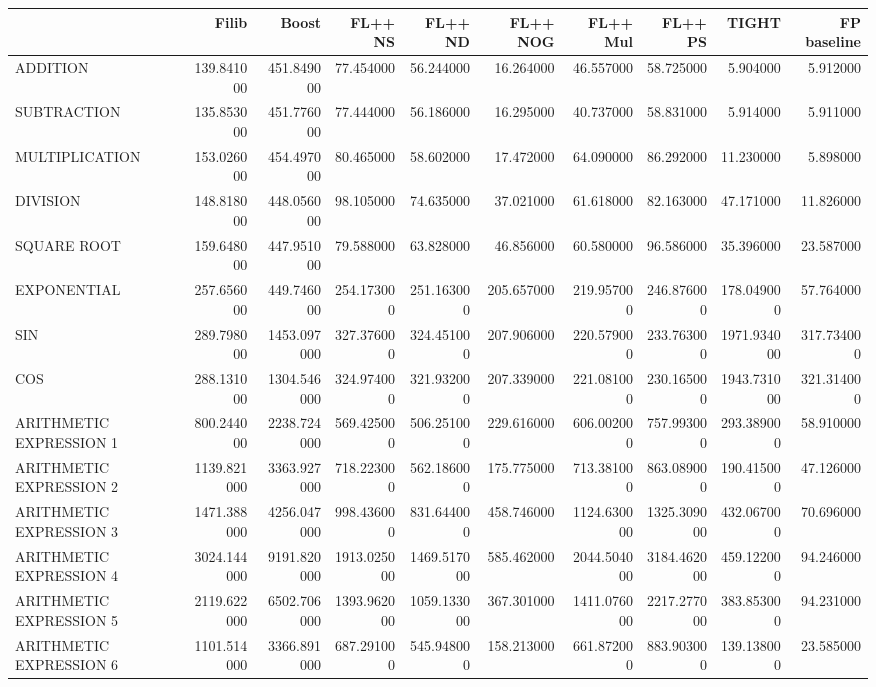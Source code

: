 \clearpage
\onecolumn
\begingroup

\tiny
\begin{longtable}{lrrrrrrrrr}
\hline
& Filib & Boost & FL++ NS & FL++ ND & FL++ NOG & FL++ Mul & FL++ PS & TIGHT & FP baseline \\
\hline
ADDITION & 139.841000 & 451.849000 & 77.454000 & 56.244000 & 16.264000 & 46.557000 & 58.725000 & 5.904000 & 5.912000 \\
SUBTRACTION & 135.853000 & 451.776000 & 77.444000 & 56.186000 & 16.295000 & 40.737000 & 58.831000 & 5.914000 & 5.911000 \\
MULTIPLICATION & 153.026000 & 454.497000 & 80.465000 & 58.602000 & 17.472000 & 64.090000 & 86.292000 & 11.230000 & 5.898000 \\
DIVISION & 148.818000 & 448.056000 & 98.105000 & 74.635000 & 37.021000 & 61.618000 & 82.163000 & 47.171000 & 11.826000 \\
SQUARE ROOT & 159.648000 & 447.951000 & 79.588000 & 63.828000 & 46.856000 & 60.580000 & 96.586000 & 35.396000 & 23.587000 \\
EXPONENTIAL & 257.656000 & 449.746000 & 254.173000 & 251.163000 & 205.657000 & 219.957000 & 246.876000 & 178.049000 & 57.764000 \\
SIN & 289.798000 & 1453.097000 & 327.376000 & 324.451000 & 207.906000 & 220.579000 & 233.763000 & 1971.934000 & 317.734000 \\
COS & 288.131000 & 1304.546000 & 324.974000 & 321.932000 & 207.339000 & 221.081000 & 230.165000 & 1943.731000 & 321.314000 \\
ARITHMETIC EXPRESSION 1 & 800.244000 & 2238.724000 & 569.425000 & 506.251000 & 229.616000 & 606.002000 & 757.993000 & 293.389000 & 58.910000 \\
ARITHMETIC EXPRESSION 2 & 1139.821000 & 3363.927000 & 718.223000 & 562.186000 & 175.775000 & 713.381000 & 863.089000 & 190.415000 & 47.126000 \\
ARITHMETIC EXPRESSION 3 & 1471.388000 & 4256.047000 & 998.436000 & 831.644000 & 458.746000 & 1124.630000 & 1325.309000 & 432.067000 & 70.696000 \\
ARITHMETIC EXPRESSION 4 & 3024.144000 & 9191.820000 & 1913.025000 & 1469.517000 & 585.462000 & 2044.504000 & 3184.462000 & 459.122000 & 94.246000 \\
ARITHMETIC EXPRESSION 5 & 2119.622000 & 6502.706000 & 1393.962000 & 1059.133000 & 367.301000 & 1411.076000 & 2217.277000 & 383.853000 & 94.231000 \\
ARITHMETIC EXPRESSION 6 & 1101.514000 & 3366.891000 & 687.291000 & 545.948000 & 158.213000 & 661.872000 & 883.903000 & 139.138000 & 23.585000 \\

\end{longtable}
